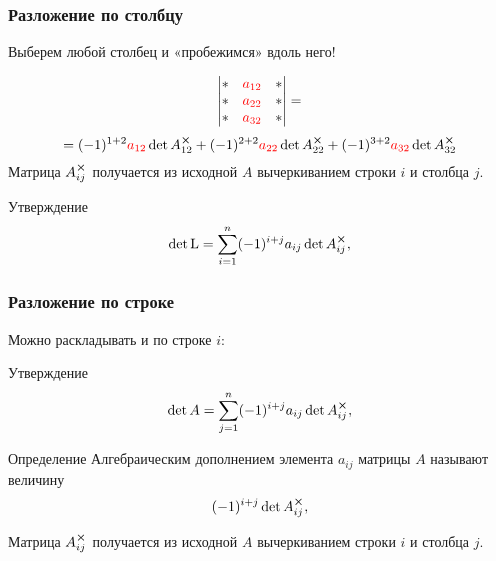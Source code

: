 \begin{frame}
    \frametitle{Разложение по столбцу}

    Выберем любой столбец и «пробежимся» вдоль него!

    \[
        \begin{vmatrix}
            * & \textcolor{red}{a_{12}} & * \\
            * & \textcolor{red}{a_{22}} & * \\
            * & \textcolor{red}{a_{32}} & * \\
        \end{vmatrix}  =      
    \]
    \[ 
       =(-1)^{1+2} \textcolor{red}{a_{12}} \det A_{12}^{\cross} +
        (-1)^{2+2} \textcolor{red}{a_{22}} \det A_{22}^{\cross} +
        (-1)^{3+2} \textcolor{red}{a_{32}} \det A_{32}^{\cross}
    \]
    Матрица $A_{ij}^{\cross}$ получается из исходной $A$ вычеркиванием строки $i$ и
    столбца $j$.
    \pause
    \begin{block}{Утверждение}       
    \[
    \det \operatorname{L} = \sum_{i=1}^{n} (-1)^{i+j} a_{ij} \det A_{ij}^{\cross},
    \]
    \end{block}

    
\end{frame}


\begin{frame}
    \frametitle{Разложение по строке}

    Можно раскладывать и по строке $i$:
\begin{block}{Утверждение}
\[
\det A = \sum_{j=1}^{n} (-1)^{i+j} a_{ij} \det A_{ij}^{\cross},
\]
\end{block}

    \begin{block}{Определение}
        \alert{Алгебраическим дополнением} элемента $a_{ij}$ матрицы $A$ называют величину
        \[
         (-1)^{i+j} \det A_{ij}^{\cross},    
        \]
    \end{block}

    Матрица $A_{ij}^{\cross}$ получается из исходной $A$ вычеркиванием строки $i$ и
    столбца $j$.

\end{frame}